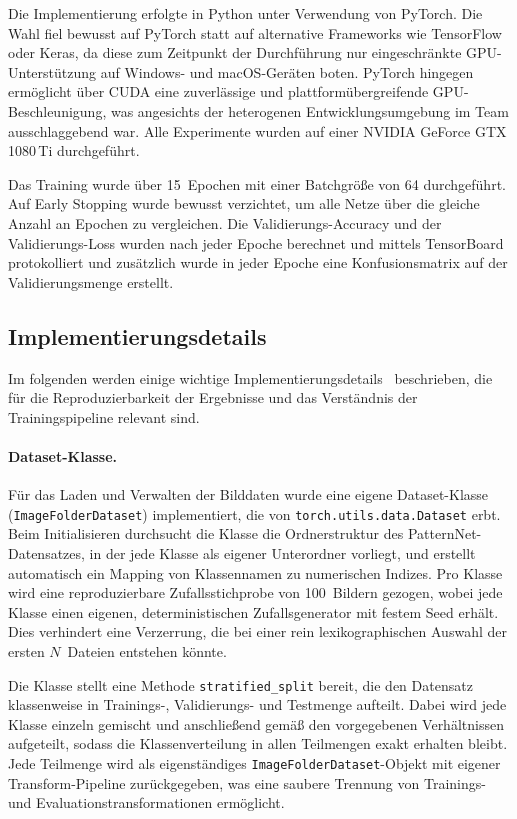 Die Implementierung erfolgte in Python unter Verwendung von PyTorch.
Die Wahl fiel bewusst auf PyTorch statt auf alternative Frameworks wie TensorFlow oder Keras, da diese zum Zeitpunkt der Durchführung nur eingeschränkte GPU-Unterstützung auf Windows- und macOS-Geräten boten.
PyTorch hingegen ermöglicht über CUDA eine zuverlässige und plattformübergreifende GPU-Beschleunigung, was angesichts der heterogenen Entwicklungsumgebung im Team ausschlaggebend war.
Alle Experimente wurden auf einer NVIDIA GeForce GTX 1080\,Ti durchgeführt.

Das Training wurde über 15~Epochen mit einer Batchgröße von 64 durchgeführt.
Auf Early Stopping wurde bewusst verzichtet, um alle Netze über die gleiche Anzahl an Epochen zu vergleichen.
Die Validierungs-Accuracy und der Validierungs-Loss wurden nach jeder Epoche berechnet und mittels TensorBoard protokolliert und zusätzlich wurde in jeder Epoche eine Konfusionsmatrix auf der Validierungsmenge erstellt.

\subsection{Implementierungsdetails}
\label{subsec:implementierung}

Im folgenden werden einige wichtige Implementierungsdetails~\cite{eigener_code} beschrieben, die für die Reproduzierbarkeit der Ergebnisse und das Verständnis der Trainingspipeline relevant sind.

\paragraph{Dataset-Klasse.}
Für das Laden und Verwalten der Bilddaten wurde eine eigene Dataset-Klasse (\texttt{ImageFolderDataset}) implementiert, die von \texttt{torch.utils.data.Dataset} erbt.
Beim Initialisieren durchsucht die Klasse die Ordnerstruktur des PatternNet-Datensatzes, in der jede Klasse als eigener Unterordner vorliegt, und erstellt automatisch ein Mapping von Klassennamen zu numerischen Indizes.
Pro Klasse wird eine reproduzierbare Zufallsstichprobe von 100~Bildern gezogen, wobei jede Klasse einen eigenen, deterministischen Zufallsgenerator mit festem Seed erhält.
Dies verhindert eine Verzerrung, die bei einer rein lexikographischen Auswahl der ersten $N$~Dateien entstehen könnte.
 
Die Klasse stellt eine Methode \texttt{stratified\_split} bereit, die den Datensatz klassenweise in Trainings-, Validierungs- und Testmenge aufteilt.
Dabei wird jede Klasse einzeln gemischt und anschließend gemäß den vorgegebenen Verhältnissen aufgeteilt, sodass die Klassenverteilung in allen Teilmengen exakt erhalten bleibt.
Jede Teilmenge wird als eigenständiges \texttt{ImageFolderDataset}-Objekt mit eigener Transform-Pipeline zurückgegeben, was eine saubere Trennung von Trainings- und Evaluationstransformationen ermöglicht.
 
